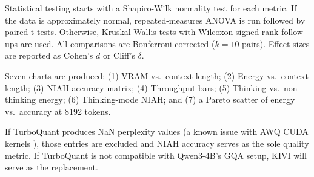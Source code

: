 \documentclass[conference]{IEEEtran}
\begin{document}
Statistical testing starts with a Shapiro-Wilk normality test for each metric. If the data is approximately normal, repeated-measures ANOVA is run followed by paired t-tests. Otherwise, Kruskal-Wallis tests with Wilcoxon signed-rank follow-ups are used. All comparisons are Bonferroni-corrected ($k = 10$ pairs). Effect sizes are reported as Cohen's $d$ or Cliff's $\delta$.

Seven charts are produced: (1) VRAM vs.~context length; (2) Energy vs.~context length; (3) NIAH accuracy matrix; (4) Throughput bars; (5) Thinking vs.~non-thinking energy; (6) Thinking-mode NIAH; and (7) a Pareto scatter of energy vs.~accuracy at 8192 tokens.

If TurboQuant produces NaN perplexity values (a known issue with AWQ CUDA kernels \cite{qwen3quant2025}), those entries are excluded and NIAH accuracy serves as the sole quality metric. If TurboQuant is not compatible with Qwen3-4B's GQA setup, KIVI \cite{kivi} will serve as the replacement.
\end{document}
